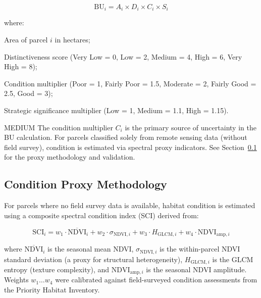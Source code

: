 \begin{equation}
\text{BU}_i = A_i \times D_i \times C_i \times S_i
\label{eq:bu}
\end{equation}

\noindent where:
\begin{description}[nosep,style=nextline,labelwidth=8mm]
  \item[$A_i$] Area of parcel $i$ in hectares;
  \item[$D_i$] Distinctiveness score (Very Low = 0, Low = 2, Medium = 4, High = 6, Very High = 8);
  \item[$C_i$] Condition multiplier (Poor = 1, Fairly Poor = 1.5, Moderate = 2, Fairly Good = 2.5, Good = 3);
  \item[$S_i$] Strategic significance multiplier (Low = 1, Medium = 1.1, High = 1.15).
\end{description}

\begin{confidencebox}{MEDIUM}
The condition multiplier $C_i$ is the primary source of uncertainty in the BU calculation. For parcels classified solely from remote sensing data (without field survey), condition is estimated via spectral proxy indicators. See Section~\ref{sec:condition-proxy} for the proxy methodology and validation.
\end{confidencebox}

\subsection{Condition Proxy Methodology}
\label{sec:condition-proxy}

For parcels where no field survey data is available, habitat condition is estimated using a composite spectral condition index (SCI) derived from:

\begin{equation}
\text{SCI}_i = w_1 \cdot \overline{\text{NDVI}}_i + w_2 \cdot \sigma_{\text{NDVI},i} + w_3 \cdot H_{\text{GLCM},i} + w_4 \cdot \text{NDVI}_{\text{amp},i}
\label{eq:sci}
\end{equation}

\noindent where $\overline{\text{NDVI}}_i$ is the seasonal mean NDVI, $\sigma_{\text{NDVI},i}$ is the within-parcel NDVI standard deviation (a proxy for structural heterogeneity), $H_{\text{GLCM},i}$ is the GLCM entropy (texture complexity), and $\text{NDVI}_{\text{amp},i}$ is the seasonal NDVI amplitude. Weights $w_1 \ldots w_4$ were calibrated against field-surveyed condition assessments from the Priority Habitat Inventory.

